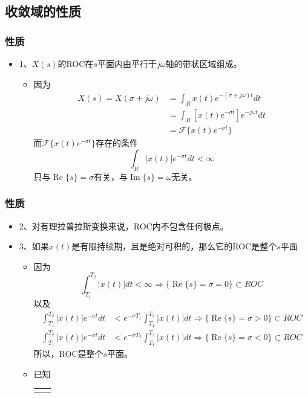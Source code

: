 \documentclass[CJKutf8,dvipsnames,table]{beamer}
\begin{document}
\begin{CJK*}{UTF8}{song}
  \section{收敛域的性质} 
  
  \begin{frame}
    \frametitle{性质}
    \begin{itemize}
    \item 1、$X(s)$的ROC在$s$平面内由平行于$j\omega$轴的带状区域组成。
    	\begin{itemize}
		\item 因为
    		\begin{align*}
    			X(s) = X(\sigma + j\omega) & = \int_R x(t)e^{-(\sigma + j\omega)t}dt \\
	                                       & = \int_R [x(t)e^{-\sigma t}] e^{-j\omega t}dt \\
	                                       & = \mathscr{F}\{ x(t) e^{-\sigma t} \}
    		\end{align*}
		而$\mathscr{F}\{ x(t) e^{-\sigma t} \}$存在的条件
		\[
			\int_R |x(t)|e^{-\sigma t}dt < \infty
		\]
		只与$\operatorname{Re}\{s\}=\sigma$有关，与$\operatorname{Im}\{s\}=\omega$无关。
		\end{itemize}
    \end{itemize}
  \end{frame} 
    
  \begin{frame}
    \frametitle{性质}
    \begin{itemize}
    \item 2、对有理拉普拉斯变换来说，ROC内不包含任何极点。
    \item 3、如果$x(t)$是有限持续期，且是绝对可积的，那么它的ROC是整个$s$平面
    	\begin{itemize}
		\item 因为
    		\[
    			\int_{T_1}^{T_2} |x(t)| dt < \infty \Rightarrow \{\operatorname{Re}\{s\}=\sigma = 0\} \subset ROC
    		\]
		以及
		\begin{align*}
			\int_{T_1}^{T_2} |x(t)|e^{-\sigma t}dt & < e^{-\sigma T_1}\int_{T_1}^{T_2} |x(t)| dt \Rightarrow \{\operatorname{Re}\{s\}=\sigma > 0\} \subset ROC \\
			\int_{T_1}^{T_2} |x(t)|e^{-\sigma t}dt & < e^{-\sigma T_2}\int_{T_1}^{T_2} |x(t)| dt \Rightarrow \{\operatorname{Re}\{s\}=\sigma < 0\} \subset ROC
		\end{align*}
		所以，ROC是整个$s$平面。
		
		\item 已知
	\begin{tabular}{ll}
	\raisebox{-.5\height}


\end{tabular}
\end{itemize}
\end{itemize}
\end{frame}
\end{CJK*}
\end{document}
